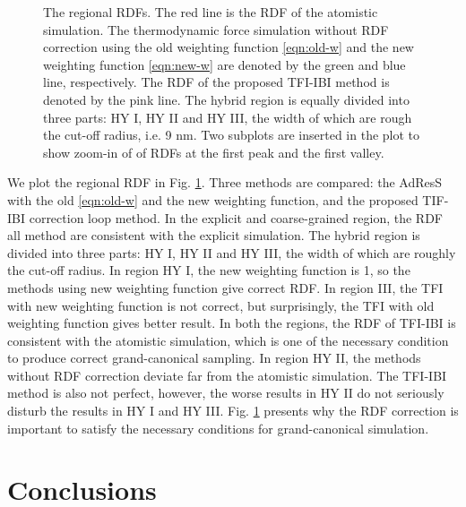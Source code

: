 \documentclass[aps,pre,preprint,unsortedaddress]{revtex4}
\newcommand{\redc}[1]{{\color{red} #1}}
\begin{document}
\begin{figure}
  \caption{The regional RDFs. The red line is the RDF of the atomistic
    simulation. The thermodynamic force simulation without RDF
    correction using the old weighting function \eqref{eqn:old-w} and
    the new weighting function \eqref{eqn:new-w} are denoted by the
    green and blue line, respectively. The RDF of the proposed TFI-IBI
    method is denoted by the pink line. The hybrid region is equally
    divided into three parts: HY I, HY II and HY III, the width of
    which are rough the cut-off radius, i.e. 9 \textsf{nm}. Two
    subplots are inserted in the plot to show zoom-in of of RDFs at
    the first peak and the first valley.  }
  \label{fig:tmp7}
\end{figure}


We plot the regional RDF in Fig. \ref{fig:tmp7}. Three methods are
compared: the AdResS with the old \eqref{eqn:old-w} and the new
weighting function, and the proposed TIF-IBI correction loop
method. In the explicit and coarse-grained region, the RDF all method
are consistent with the explicit simulation. The hybrid region is
divided into three parts: HY I, HY II and HY III, the width of which
are roughly the cut-off radius. In region HY I, the new weighting
function is 1, so the methods using new weighting function give
correct RDF. In region III, the TFI with new weighting function is not
correct, but surprisingly, the TFI with old weighting function gives
better result. In both the regions, the RDF of TFI-IBI is consistent
with the atomistic simulation, which is one of the necessary condition
to produce correct grand-canonical sampling.  In region HY II, the
methods without RDF correction deviate far from the atomistic
simulation. The TFI-IBI method is also not perfect, however, the worse
results in HY II do not seriously disturb the results in HY I and HY
III. Fig. \ref{fig:tmp7} presents why the RDF correction is important
to satisfy the necessary conditions for grand-canonical simulation.


\section{Conclusions}
\label{sec:conclusions}



{}

\end{document}
